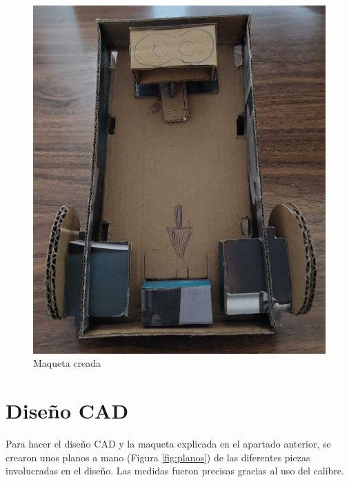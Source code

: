\begin{figure}[ht!]
\begin{minipage}{0.4\linewidth}
		\includegraphics[width=\linewidth]{figs/cap5/boceto_carton7.jpeg}
		\caption*{\centering}
	\end{minipage}
	\caption{Maqueta creada}
	\label{fig:maqueta2}
\end{figure}


\section{Diseño CAD}
\label{sec:diseñocad}

Para hacer el diseño \acs{CAD} y la maqueta explicada en el apartado anterior, se crearon unos planos a mano (Figura \ref{fig:planos}) de las diferentes piezas involucradas en el diseño. Las medidas fueron precisas gracias al uso del calibre.


